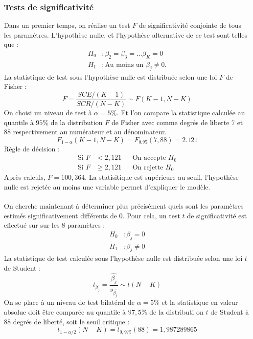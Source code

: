 \documentclass[]{article}
\begin{document}
\subsubsection{Tests de significativité}
Dans un premier temps, on réalise un test $F$ de significativité conjointe de tous les paramètres. L'hypothèse nulle, et l'hypothèse alternative de ce test sont telles que :
\begin{equation*}
\begin{split}
    H_0 &: \beta_2 = \beta_3 = \dots \beta_K =0 \\
    H_1 &: \text{Au moins un }\beta_j \neq 0.
\end{split}
\end{equation*}
La statistique de test sous l'hypothèse nulle est distribuée selon une loi $F$ de Fisher :
\begin{equation*}
    F = \frac{SCE/(K-1)}{SCR/(N-K)} \sim F(K-1, N-K)
\end{equation*}
On choisi un niveau de test à $\alpha = 5\%$. Et l'on compare la statistique calculée au quantile à $95\%$ de la distribution $F$ de Fisher avec 
comme degrés de liberte $7$ et $88$ respectivement au numérateur et au dénominateur. 
\begin{equation*}
    F_{1-\alpha} (K-1, N-K) = F_{0.95}(7, 88) = 2.121
\end{equation*}
Règle de décision : 
\begin{align*}
		\text{Si } F & < 2,121 & & \text{On accepte }H_0 \\ 
		\text{Si } F & \ge 2,121 & & \text{On rejette }H_0 
\end{align*}
Après calculs, $F = 100,364$. La statisitique est supérieure au seuil, l'hypothèse nulle est rejetée au moins une variable permet d'expliquer le modèle.
\\ \\
On cherche maintenant à déterminer plus précisément quels sont les paramètres estimés significativement différents de 0. Pour cela, un test $t$ de 
significativité est effectué sur sur les $8$ paramètres :
\begin{equation*}
\begin{split}
    H_0 &: \beta_j =0 \\
    H_1 &: \beta_j \neq 0
\end{split}
\end{equation*}
La statistique de test calculée sous l'hypothèse nulle est distribuée selon une loi $t$ de Student : 
\begin{equation*}
    t_{\beta_j} = \frac{\hat{\beta_j}}{s_{\hat{\beta_j}}} \sim t(N-K)
\end{equation*}
On se place à un niveau de test bilatéral de $\alpha = 5\%$ et la statistique en valeur absolue doit être comparée au quantile à $97,5\%$ de la distributi
on $t$ de Student à $88$ degrés de liberté, soit le seuil critique :
\begin{equation*}
    t_{1-\alpha/2}(N-K) = t_{0,975}(88) = 1,987289865 
\end{equation*}
\end{document}

